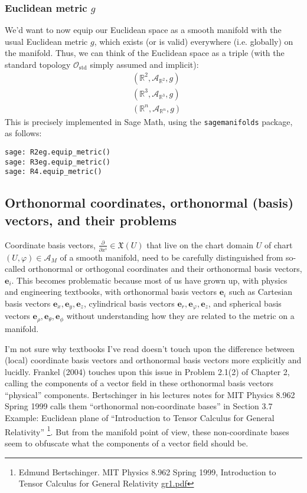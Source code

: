 \documentclass[10pt, twoside]{amsart}
\begin{document}
\begin{multicols*}{2}
\subsubsection{Euclidean metric $g$}

We'd want to now equip our Euclidean space as a smooth manifold with the usual Euclidean metric $g$, which exists (or is valid) everywhere (i.e. globally) on the manifold.  Thus, we can think of the Euclidean space as a triple (with the standard topology $\mathcal{O}_{\text{std}}$ simply assumed and implicit):
\[
\begin{aligned}
  & (\mathbb{R}^2, \mathcal{A}_{\mathbb{R}^2}, g) \\ 
  &  (\mathbb{R}^3, \mathcal{A}_{\mathbb{R}^3}, g) \\ 
  &  (\mathbb{R}^n, \mathcal{A}_{\mathbb{R}^n}, g) 
\end{aligned}
\]
This is precisely implemented in Sage Math, using the \verb|sagemanifolds| package, as follows:
\begin{lstlisting}
sage: R2eg.equip_metric()
sage: R3eg.equip_metric()
sage: R4.equip_metric()
\end{lstlisting}

\subsection{Orthonormal coordinates, orthonormal (basis) vectors, and their problems}

Coordinate basis vectors, $\frac{\partial}{\partial x^i} \in \mathfrak{X}(U)$ that live on the chart domain $U$ of chart $(U,\varphi) \in \mathcal{A}_M$ of a smooth manifold, need to be carefully distinguished from so-called orthonormal or orthogonal coordinates and their orthonormal basis vectors, $\mathbf{e}_i$.  This becomes problematic because most of us have grown up, with physics and engineering textbooks, with orthonormal basis vectors $\mathbf{e}_i$ such as Cartesian basis vectors $\mathbf{e}_x,\mathbf{e}_y,\mathbf{e}_z$, cylindrical basis vectors $\mathbf{e}_r,\mathbf{e}_{\varphi}, \mathbf{e}_z$, and spherical basis vectors $\mathbf{e}_{\rho}, \mathbf{e}_{\theta}, \mathbf{e}_{\phi}$ without understanding how they are related to the metric on a manifold.  

I'm not sure why textbooks I've read doesn't touch upon the difference between (local) coordinate basis vectors and orthonormal basis vectors more explicitly and lucidly.  Frankel (2004) \cite{TFrankel2004} touches upon this issue in Problem 2.1(2) of Chapter 2, calling the components of a vector field in these orthonormal basis vectors ``physical'' components.  Bertschinger in his lectures notes for MIT Physics 8.962 Spring 1999 calls them ``orthonormal non-coordinate bases'' in Section 3.7 Example: Euclidean plane of ``Introduction to Tensor Calculus for General Relativity'' \footnote{Edmund Bertschinger. MIT Physics 8.962 Spring 1999,  Introduction to Tensor Calculus for General Relativity \href{http://web.mit.edu/edbert/GR/gr1.pdf}{gr1.pdf}}.  But from the manifold point of view, these non-coordinate bases seem to obfuscate what the components of a vector field should be.  


\end{multicols*}
\end{document}
